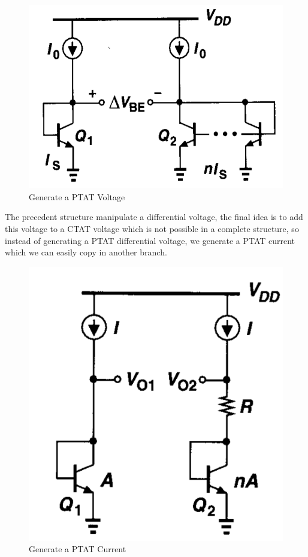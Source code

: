 \documentclass[11pt,a4paper]{report}
\begin{document}
\begin{figure}[h]
  \begin{center}
    \includegraphics[scale=0.35]{photo/PTAT_1}
  \end{center}
  \caption{Generate a PTAT Voltage}
  \label{PTAT_1}
\end{figure}

\newpage

The precedent structure manipulate a differential voltage, the final idea is to add this voltage to a CTAT voltage which is not possible in a complete structure, so instead of generating a PTAT differential voltage, we generate a PTAT current which we can easily copy in another branch.

\begin{figure}[h]
  \begin{center}
    \includegraphics[scale=0.35]{photo/PTAT2}
  \end{center}
  \caption{Generate a PTAT Current}
\end{figure}
\end{document}
